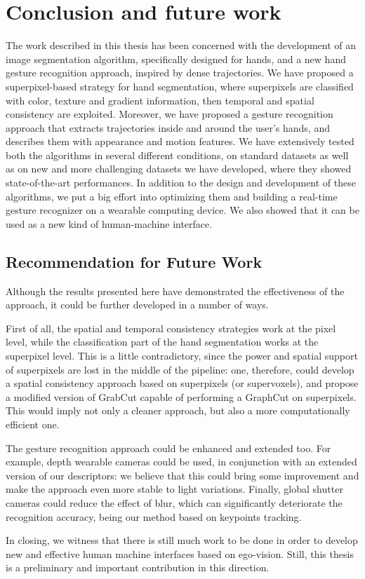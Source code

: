 \chapter{Conclusion and future work}


The work described in this thesis has been concerned with the development of an image segmentation algorithm, specifically designed for hands, and a new hand gesture recognition approach, inspired by dense trajectories. We have proposed a superpixel-based strategy for hand segmentation, where superpixels are classified with color, texture and gradient information, then temporal and spatial consistency are exploited. Moreover, we have proposed a gesture recognition approach that extracts trajectories inside and around the user's hands, and describes them with appearance and motion features. We have extensively tested both the algorithms in several different conditions, on standard datasets as well as on new and more challenging datasets we have developed, where they showed state-of-the-art performances. In addition to the design and development of these algorithms, we put a big effort into optimizing them and building a real-time gesture recognizer on a wearable computing device. We also showed that it can be used as a new kind of human-machine interface.

\section{Recommendation for Future Work}
Although the results presented here have demonstrated the effectiveness of the approach, it could be further developed in a number of ways.

First of all, the spatial and temporal consistency strategies work at the pixel level, while the classification part of the hand segmentation works at the superpixel level. This is a little contradictory, since the power and spatial support of superpixels are lost in the middle of the pipeline: one, therefore, could develop a spatial consistency approach based on superpixels (or supervoxels), and propose a modified version of GrabCut capable of performing a GraphCut on superpixels. This would imply not only a cleaner approach, but also a more computationally efficient one.

The gesture recognition approach could be enhanced and extended too. For example, depth wearable cameras could be used, in conjunction with an extended version of our descriptors: we believe that this could bring some improvement and make the approach even more stable to light variations. Finally, global shutter cameras could reduce the effect of blur, which can significantly deteriorate the recognition accuracy, being our method based on keypoints tracking.

In closing, we witness that there is still much work to be done in order to develop new and effective human machine interfaces based on ego-vision. Still, this thesis is a preliminary and important contribution in this direction.